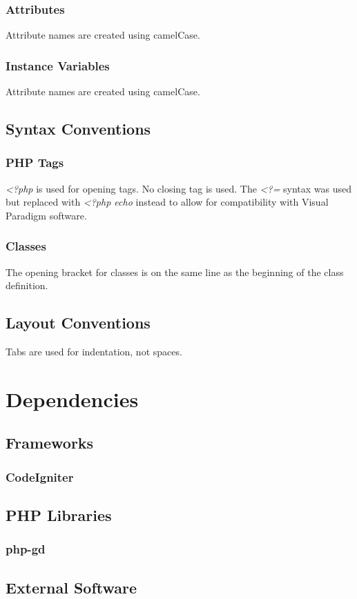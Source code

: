 \documentclass[11pt]{article} %
\begin{document}
\subsubsection{Attributes}
Attribute names are created using camelCase.
\subsubsection{Instance Variables}
Attribute names are created using camelCase.
\subsection{Syntax Conventions}
\subsubsection{PHP Tags}
\textit{\textless?php} is used for opening tags. No closing tag is used. The \textit{\textless?=} syntax was used but replaced with \textit{\textless?php echo} instead to allow for compatibility with Visual Paradigm software.
\subsubsection{Classes}
The opening bracket for classes is on the same line as the beginning of the class definition.
\subsection{Layout Conventions}
Tabs are used for indentation, not spaces.
\newpage

\section{Dependencies}
\subsection{Frameworks}
\subsubsection{CodeIgniter}
\subsection{PHP Libraries}
\subsubsection{php-gd}
\subsection{External Software}
\end{document}

